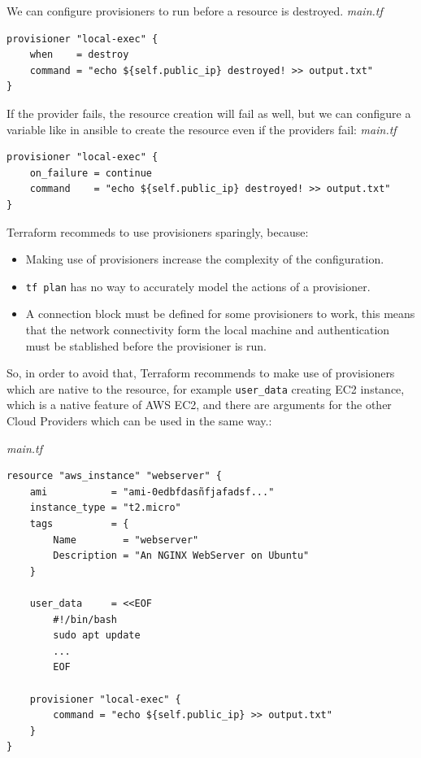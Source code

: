 \documentclass{article}
\newenvironment{blocktemplate}[1]{%
    \tcolorbox[beamer,%
    noparskip,breakable,
    colframe=Blue,%
    colbacklower=LimeGreen!75!LightGreen,%
    title=#1]}%
    {\endtcolorbox}
\newenvironment{codetemplate}[1][]{%
  \mybasecolorbox[#1]
  \itshape
}{%
  \endmybasecolorbox
}
\begin{document}
We can configure provisioners to run before a resource is destroyed.
\begin{codetemplate}{main.tf}
\begin{verbatim}
provisioner "local-exec" {
    when    = destroy
    command = "echo ${self.public_ip} destroyed! >> output.txt"
}
\end{verbatim}
\end{codetemplate}

If the provider fails, the resource creation will fail as well, but we can configure a variable like in ansible to create the resource even if the providers fail:
\begin{codetemplate}{main.tf}
\begin{verbatim}
provisioner "local-exec" {
    on_failure = continue
    command    = "echo ${self.public_ip} destroyed! >> output.txt"
}
\end{verbatim}
\end{codetemplate}

\begin{blocktemplate}{Note}
Terraform recommeds to use provisioners sparingly, because:
\begin{itemize}
    \item Making use of provisioners increase the complexity of the configuration.
    \item \verb|tf plan| has no way to accurately model the actions of a provisioner.
    \item A connection block must be defined for some provisioners to work, this means that the network connectivity form the local machine and authentication must be stablished before the provisioner is run.  
\end{itemize}
\end{blocktemplate}

So, in order to avoid that, Terraform recommends to make use of provisioners which are native to the resource, for example \verb|user_data| creating EC2 instance, which is a native feature of AWS EC2, and there are arguments for the other Cloud Providers which can be used in the same way.:

\begin{codetemplate}{main.tf}
\begin{verbatim}
resource "aws_instance" "webserver" {
    ami           = "ami-0edbfdasñfjafadsf..."
    instance_type = "t2.micro"
    tags          = {
        Name        = "webserver"
        Description = "An NGINX WebServer on Ubuntu"
    }
    
    user_data     = <<EOF
        #!/bin/bash
        sudo apt update
        ...
        EOF 

    provisioner "local-exec" {
        command = "echo ${self.public_ip} >> output.txt"
    }
}
\end{verbatim}
\end{codetemplate}
\end{document}
